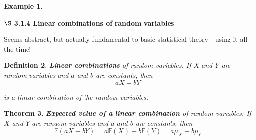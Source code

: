 \documentclass[12pt]{amsart}
\newtheorem{theorem}{Theorem}[section]
\newtheorem{definition}[theorem]{Definition}
\newtheorem{example}[theorem]{Example}
\begin{document}
{\begin{example}
\end{example} 





\newpage


$\S$ \textbf{3.1.4 Linear combinations of random variables}

\color{blue}
Seems abstract, but actually fundamental to basic statistical theory - using it all the time!
\color{black}


\begin{definition}{\textbf{Linear combinations} of random variables.} \newline
If $X$ and $Y$ are random variables and $a$ and $b$ are constants, then 
\color{blue}
$$aX+bY$$
\color{black}
\vspace{1cm}

is a linear combination of the random variables.
\end{definition}



\begin{theorem}{\textbf{Expected value of a linear combination} of random variables.} \newline
If $X$ and $Y$ are random variables and $a$ and $b$ are constants, then 
\color{blue}
$$\mathbb{E}(aX + bY) = a\mathbb{E}(X) + b\mathbb{E}(Y) = a\mu_X + b\mu_Y$$
\color{black}
\vspace{1cm}


\end{theorem}



%
%
%
%



}
\end{document}
